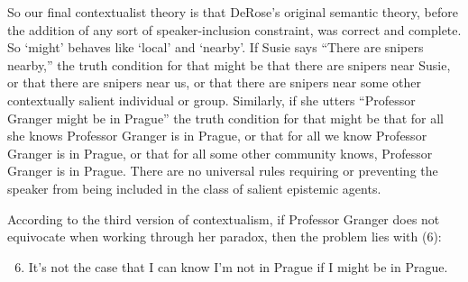 So our final contextualist theory is that DeRose's original semantic theory, before the addition of any sort of speaker-inclusion constraint, was correct and complete. So `might' behaves like `local' and `nearby'. If Susie says ``There are snipers nearby,'' the truth condition for that might be that there are snipers near Susie, or that there are snipers near us, or that there are snipers near some other contextually salient individual or group. Similarly, if she utters ``Professor Granger might be in Prague'' the truth condition for that might be that for all she knows Professor Granger is in Prague, or that for all we know Professor Granger is in Prague, or that for all some other community knows, Professor Granger is in Prague. There are no universal rules requiring or preventing the speaker from being included in the class of salient epistemic agents.
 
According to the third version of contextualism, if Professor Granger does not equivocate when working through her paradox, then the problem lies with (6):
 
\begin{enumerate}
\setcounter{enumi}{5}
\item It's not the case that I can know I'm not in Prague if I might be in Prague.
\end{enumerate}
 
